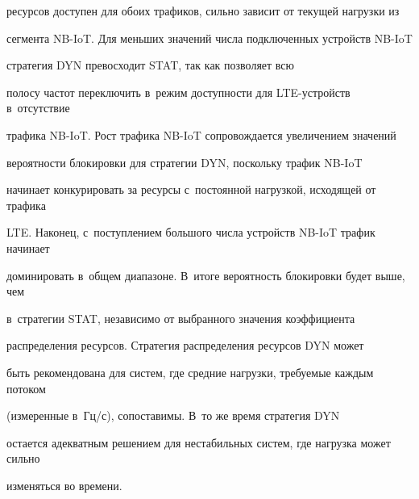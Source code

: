 ресурсов доступен для обоих трафиков, сильно зависит от текущей нагрузки из 


сегмента NB-IoT. Для меньших значений числа подключенных устройств NB-IoT 


стратегия  {DYN} превосходит  {STAT}, так как позволяет всю  


полосу частот переключить в~режим доступности для LTE-устройств в~отсутствие 


трафика NB-IoT. Рост трафика NB-IoT сопровождается увеличением значений 


вероятности блокировки для стратегии  {DYN}, поскольку трафик NB-IoT 


начинает конкурировать за ресурсы с~постоянной нагрузкой, исходящей от трафика 


LTE. Наконец, с~поступлением большого числа устройств NB-IoT трафик начинает 


доминировать в~общем диапазоне. В~итоге вероятность блокировки будет выше, чем 


в~стратегии  {STAT}, независимо от выбранного значения коэффициента 


распределения ресурсов. Стратегия распределения ресурсов  {DYN} может 


быть рекомендована для систем, где средние нагрузки, требуемые каждым потоком 


(измеренные в~Гц\!/\!с), сопоставимы. В~то же время стратегия {DYN} 


остается адекватным решением для нестабильных систем, где нагрузка может сильно 


изменяться во времени.






